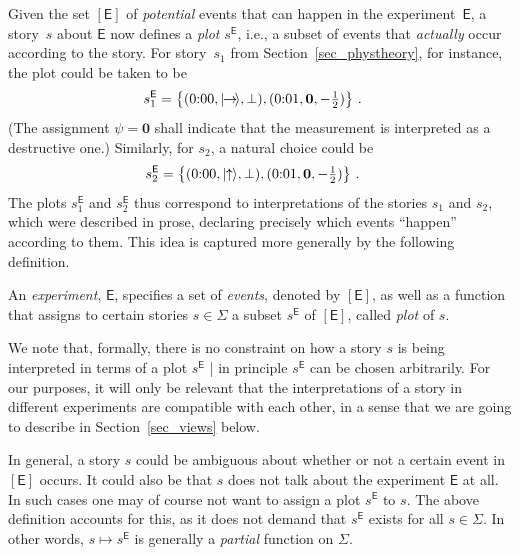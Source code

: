 \documentclass{article}
\theoremstyle{plain}
\theoremstyle{definition}
\newcommand*{\ket}[1]{{| #1 \rangle}}
\newcommand*{\Exp}{\mathsf{E}}
\newcommand*{\spinup}{\ket{{\hspace{-0.1ex}\uparrow\hspace{-0.1ex}}}}
\newcommand*{\spinright}{\ket{{\hspace{-0.2ex}\rightarrow\hspace{-0.4ex}}}}
\newcommand*{\sminus}{{\textstyle - \frac{1}{2}}}
\begin{document}
Given the set $[\Exp]$ of \emph{potential} events that can happen in the experiment~$\Exp$, a story~$s$ about $\Exp$ now defines a \emph{plot} $s^{\Exp}$, i.e., a subset of events that \emph{actually} occur according to the story. For story~$s_1$ from Section~\ref{sec_phystheory}, for instance, the plot could be taken to be
\begin{align*}
 s_1^{\Exp} & =  \bigl\{ (\text{0:00}, \spinright, \bot),  (\text{0:01}, \mathbf{0},  \sminus) \bigr\} \ .
 \end{align*}
 (The assignment $\psi = \mathbf{0}$ shall indicate that the measurement is interpreted as a destructive one.)  Similarly, for $s_2$, a natural choice could be
 \begin{align*}
  s_2^{\Exp} & = \bigl\{ (\text{0:00}, \spinup, \bot),  (\text{0:01}, \mathbf{0},  \sminus) \bigr\} \ .
\end{align*}
The plots $s_1^{\Exp}$ and $s_2^{\Exp}$ thus correspond to interpretations of the stories $s_1$ and $s_2$, which were described in prose, declaring precisely which events ``happen'' according to them. This idea is captured more generally by the following definition.

\begin{shaded}
  \noindent An \emph{experiment}, $\Exp$, specifies a set of \emph{events}, denoted by $[\Exp]$, as well as a function that assigns to certain stories $s \in \Sigma$ a subset $s^\Exp$ of $[\Exp]$,  called \emph{plot} of $s$. 
\end{shaded}

We note that, formally, there is no constraint on how a story $s$ is being interpreted in terms of a plot $s^\Exp$ | in principle $s^\Exp$ can be chosen arbitrarily. For our purposes, it will only be relevant that the interpretations of a story in different experiments are compatible with each other, in a sense that we are going to describe in Section~\ref{sec_views} below. 

In general, a story $s$ could be ambiguous about whether or not a certain event in $[\Exp]$ occurs. It could also be that $s$ does not talk about the experiment $\Exp$ at all.  In such cases one may of course not want to assign a plot $s^{\Exp}$ to $s$. The above definition accounts for this, as it does not demand that  $s^{\Exp}$ exists for all $s \in \Sigma$.  In other words,  $s \mapsto s^{\Exp}$ is generally a \emph{partial} function on $\Sigma$.
\end{document}
